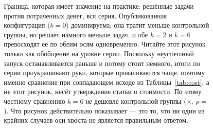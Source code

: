 
\begin{figure}[t]
\centering
{}
\caption{Граница, которая имеет значение на практике: решённые задачи против
потраченных денег, вся серия. Опубликованная конфигурация ($k{=}0$)
доминируема: она тратит меньше контрольной группы, но решает намного меньше
задач, и обе $k{=}2$ и $k{=}6$ превосходят её по обеим осям одновременно.
Читайте этот рисунок только как обобщение на уровне серии. Поскольку
неуспешный запуск останавливается раньше и потому стоит немного, итоги по
серии приукрашивают руки, которые проваливаются чаще, поэтому именно
сравнение при совпадающем исходе из Таблицы~\ref{tab:cost}, а не этот
рисунок, несёт утверждение статьи о стоимости. По этому честному сравнению
$k{=}6$ \emph{не} дешевле контрольной группы (\CostRatioTailSix$\times$,
$p={}$\CostSignPTailSix). Что рисунок действительно показывает — это то, что
ни один из крайних случаев оси хвоста не является правильным ответом.}
\label{fig:pareto}
\end{figure}

